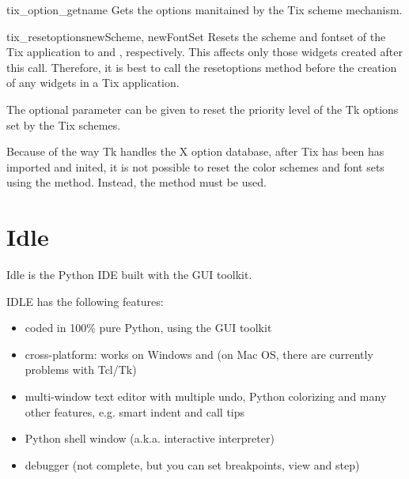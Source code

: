 \begin{methoddesc}{tix_option_get}{name}
Gets the options manitained by the Tix scheme mechanism.
\end{methoddesc}

\begin{methoddesc}{tix_resetoptions}{newScheme, newFontSet}
Resets the scheme and fontset of the Tix application to
 and , respectively.  This affects only
those widgets created after this call.  Therefore, it is best to call
the resetoptions method before the creation of any widgets in a Tix
application.

The optional parameter  can be given to reset the
priority level of the Tk options set by the Tix schemes.

Because of the way Tk handles the X option database, after Tix has
been has imported and inited, it is not possible to reset the color
schemes and font sets using the  method.
Instead, the  method must be used.
\end{methoddesc}





\section{Idle \label{idle}}


Idle is the Python IDE built with the  GUI toolkit.  


IDLE has the following features:

\begin{itemize}
\item   coded in 100\% pure Python, using the  GUI toolkit

\item   cross-platform: works on Windows and \UNIX{} (on Mac OS, there are
currently problems with Tcl/Tk)

\item   multi-window text editor with multiple undo, Python colorizing
and many other features, e.g. smart indent and call tips

\item   Python shell window (a.k.a. interactive interpreter)

\item   debugger (not complete, but you can set breakpoints, view  and step)
\end{itemize}


